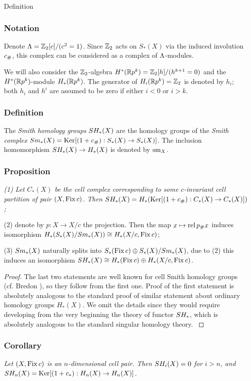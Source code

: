 \documentclass{article}
\begin{document}
\begin{subsubsection}{ Definition}
\subsubsection{Notation} Denote $\Lambda=\mathbb Z_2[c]/(c^2=1)$.
Since $\mathbb Z_2$ acts on $S_*(X)$ via the induced involution $c_\#$,
this complex can be considered as a complex of $\Lambda$-modules.

We will also consider the $\mathbb Z_2$-algebra $H^*(\mathbb R p^k)=\mathbb Z_2[h]/(h^{k+1}=0)$
and the $H^*(\mathbb R p^k)$-module $H_*(\mathbb R p^k)$. The generator of
$H_i(\mathbb R p^k)=\mathbb Z_2$ is denoted by $h_i$; both $h_i$ and $h^i$ are
assumed to be zero if either $i<0$ or $i>k$.

\subsubsection{Definition} The {\it Smith homology groups\/}
$SH_*(X)$ are the homology groups of the {\it Smith complex\/}
$Sm_*(X)=\operatorname{Ker}[(1+c_\#):S_*(X)\to S_*(X)]$. The inclusion
homomorphism $SH_*(X)\to H_*(X)$ is denoted by $\operatorname{sm}_X$.

\subsubsection{Proposition} {\it (1) Let $C_*(X)$ be the cell complex
corresponding to some $c$-invariant cell partition of pair $(X,\operatorname{Fix} c)$.
Then $SH_*(X)=H_*(\operatorname{Ker}[(1+c_\#):C_*(X)\to C_*(X)])$;

(2) denote by $p:X\to X/c$ the projection. Then the map
$x\mapsto \operatorname{rel} p_\# x$ induces isomorphism
$H_*(S_*(X)/Sm_*(X))\cong H_*(X/c,\operatorname{Fix} c)$;

(3) $Sm_*(X)$ naturally splits into
$S_*(\operatorname{Fix} c)\oplus S_*(X)/Sm_*(X)$, due to (2) this induces an
isomorphism $SH_*(X)\cong H_*(\operatorname{Fix} c)\oplus H_*(X/c,\operatorname{Fix} c)$.
}

\begin{proof}{ The last two statements are well known for cell
Smith homology groups (cf. Bredon \cite{1}), so they follow
from the first one. Proof of the first statement is absolutely
analogous to the standard proof of similar statement about
ordinary homology groups $H_*(X)$. We omit the details since
they would require developing from the very beginning the theory
of functor $SH_*$, which is absolutely analogous to the standard
singular homology theory. 
}\end{proof}
\subsubsection{Corollary} {\it Let $(X,\operatorname{Fix} c)$ is an $n$-dimensional
cell pair. Then $SH_i(X)=0$ for $i>n$, and
$SH_n(X)=\operatorname{Ker}[(1+c_*):H_n(X)\to H_n(X)]$.
}


\end{subsubsection}
\end{document}
